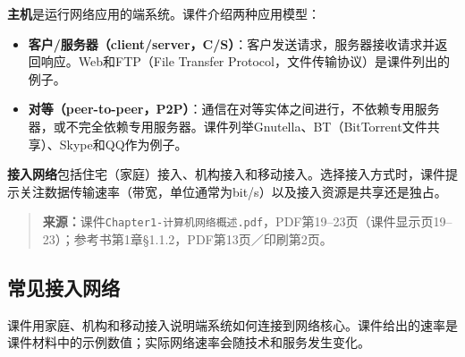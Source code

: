\textbf{主机}是运行网络应用的端系统。课件介绍两种应用模型：
\begin{itemize}
  \item \textbf{客户/服务器（client/server，C/S）}：客户发送请求，服务器接收请求并返回响应。Web和FTP（File Transfer Protocol，文件传输协议）是课件列出的例子。
  \item \textbf{对等（peer-to-peer，P2P）}：通信在对等实体之间进行，不依赖专用服务器，或不完全依赖专用服务器。课件列举Gnutella、BT（BitTorrent文件共享）、Skype和QQ作为例子。
\end{itemize}

\textbf{接入网络}包括住宅（家庭）接入、机构接入和移动接入。选择接入方式时，课件提示关注数据传输速率（带宽，单位通常为bit/s）以及接入资源是共享还是独占。

\begin{quote}\small\textbf{来源：}课件\texttt{Chapter1-计算机网络概述.pdf}，PDF第19--23页（课件显示页19--23）；参考书第1章§1.1.2，PDF第13页／印刷第2页。\end{quote}
\annotationarea[4]

\subsection{常见接入网络}

课件用家庭、机构和移动接入说明端系统如何连接到网络核心。课件给出的速率是课件材料中的示例数值；实际网络速率会随技术和服务发生变化。

